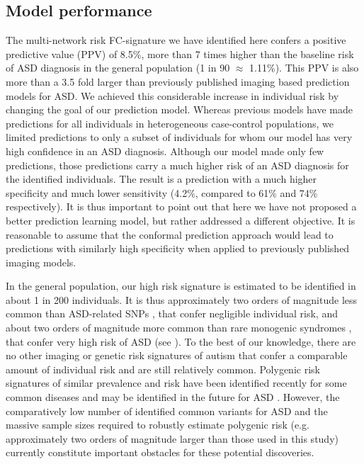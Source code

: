 \documentclass[9pt,lineno]{elife}
\begin{document}
\subsection{Model performance}
The multi-network risk FC-signature we have identified here confers a positive predictive value (PPV) of 8.5\%, more than 7 times higher than the baseline risk of ASD diagnosis in the general population (1 in 90 $\approx$ 1.11\%). This PPV is also more than a 3.5 fold larger than previously published imaging based prediction models for ASD. We achieved this considerable increase in individual risk by changing the goal of our prediction model. Whereas previous models have made predictions for all individuals in heterogeneous case-control populations, we limited predictions to only a subset of individuals for whom our model has very high confidence in an ASD diagnosis. Although our model made only few predictions, those predictions carry a much higher risk of an ASD diagnosis for the identified individuals. The result is a prediction with a much higher specificity \citep[99.5\% compared to 72.3\% and 63\% for traditional approaches,][]{Heinsfeld2018-yl,Abraham2017-vf} and much lower sensitivity (4.2\%, compared to 61\% and 74\% respectively). It is thus important to point out that here we have not proposed a better prediction learning model, but rather addressed a different objective. It is reasonable to assume that the conformal prediction approach would lead to predictions with similarly high specificity when applied to previously published imaging models.

In the general population, our high risk signature is estimated to be identified in about 1 in 200 individuals. It is thus approximately two orders of magnitude less common than ASD-related SNPs \citep{Grove2019-vz}, that confer negligible individual risk, and about two orders of magnitude more common than rare monogenic syndromes \citep{De_la_Torre-Ubieta2016-fw}, that confer very high risk of ASD (see ). To the best of our knowledge, there are no other imaging or genetic risk signatures of autism that confer a comparable amount of individual risk and are still relatively common. Polygenic risk signatures of similar prevalence and risk have been identified recently for some common diseases \citep{Khera2018-of} and may be identified in the future for ASD \citep{Martin2018-id}. However, the comparatively low number of identified common variants for ASD \citep[i.e. only 5 ASD specific SNPs have been robustly identified to date, ][compared to 108 that have been identified for schizophrenia,  \citealt{Schizophrenia_Working_Group_of_the_Psychiatric_Genomics_Consortium2014-ld}]{Grove2019-vz}  and the massive sample sizes required to robustly estimate polygenic risk (e.g. approximately two orders of magnitude larger than those used in this study) currently constitute important obstacles for these potential discoveries. 
\end{document}
